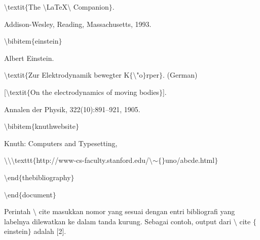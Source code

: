 \begin{itemize}
\hspace*{0.5in}$\setminus$textit$ \{ $The $\setminus$LaTeX$\setminus$ Companion$ \} $. \par

\hspace*{0.5in}Addison-Wesley, Reading, Massachusetts, 1993. \par

\hspace*{0.5in}$\setminus$bibitem$ \{ $einstein$ \} $ \par

\hspace*{0.5in}Albert Einstein. \par

\hspace*{0.5in}$\setminus$textit$ \{ $Zur Elektrodynamik bewegter K$ \{ $$\setminus$"o$ \} $rper$ \} $. (German) \par

\hspace*{0.5in}[$\setminus$textit$ \{ $On the electrodynamics of moving bodies$ \} $]. \par

\hspace*{0.5in}Annalen der Physik, 322(10):891–921, 1905. \par

\hspace*{0.5in}$\setminus$bibitem$ \{ $knuthwebsite$ \} $ \par

\hspace*{0.5in}Knuth: Computers and Typesetting,\par

\hspace*{0.5in}$\setminus$$\setminus$$\setminus$texttt$ \{ $http://www-cs-faculty.stanford.edu/$\setminus$$ \sim $$ \{ $$ \} $uno/abcde.html$ \} $\par

\hspace*{0.5in}$\setminus$end$ \{ $thebibliography$ \} $ \par

\hspace*{0.5in}$\setminus$end$ \{ $document$ \} $\par

Perintah $\setminus$ cite masukkan nomor yang sesuai dengan entri bibliografi yang labelnya dilewatkan ke dalam tanda kurung. Sebagai contoh, output dari $\setminus$ cite $ \{ $einstein$ \} $ adalah [2].\par


\end{itemize}
